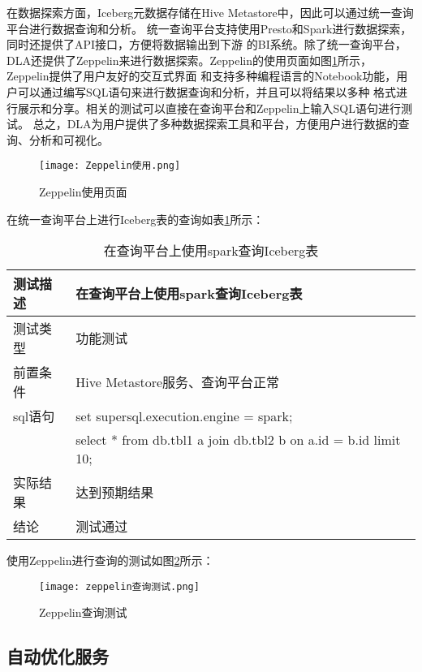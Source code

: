 在数据探索方面，Iceberg元数据存储在Hive Metastore中，因此可以通过统一查询平台进行数据查询和分析。
统一查询平台支持使用Presto和Spark进行数据探索，同时还提供了API接口，方便将数据输出到下游
的BI系统。除了统一查询平台，DLA还提供了Zeppelin来进行数据探索。Zeppelin的使用页面如图\ref{fig:Zeppelin使用}所示，
Zeppelin提供了用户友好的交互式界面
和支持多种编程语言的Notebook功能，用户可以通过编写SQL语句来进行数据查询和分析，并且可以将结果以多种
格式进行展示和分享。相关的测试可以直接在查询平台和Zeppelin上输入SQL语句进行测试。
总之，DLA为用户提供了多种数据探索工具和平台，方便用户进行数据的查询、分析和可视化。

\begin{figure}[H]
  \centering
  \texttt{[image: Zeppelin使用.png]}
  \caption{Zeppelin使用页面}
  \label{fig:Zeppelin使用}
\end{figure}

在统一查询平台上进行Iceberg表的查询如表\ref{tab:exampletable12}所示：

\begin{table}[H]
  \centering
  \caption{在查询平台上使用spark查询Iceberg表}
  \label{tab:exampletable12}
  \begin{tabular}{ll}
    \toprule
    测试描述         & 在查询平台上使用spark查询Iceberg表         \\
    \midrule
    测试类型         & 功能测试         \\
    前置条件         & Hive Metastore服务、查询平台正常         \\
    sql语句         & set supersql.execution.engine = spark;    \\
                   & select * from db.tbl1 a join db.tbl2 b on a.id = b.id limit 10;       \\
    实际结果         & 达到预期结果           \\
    结论            & 测试通过           \\
    \bottomrule
  \end{tabular}
\end{table}

使用Zeppelin进行查询的测试如图\ref{fig:badge1}所示：

\begin{figure}[H]
  \centering
  \texttt{[image: zeppelin查询测试.png]}
  \caption{Zeppelin查询测试}
  \label{fig:badge1}
\end{figure}

\subsection{自动优化服务}

